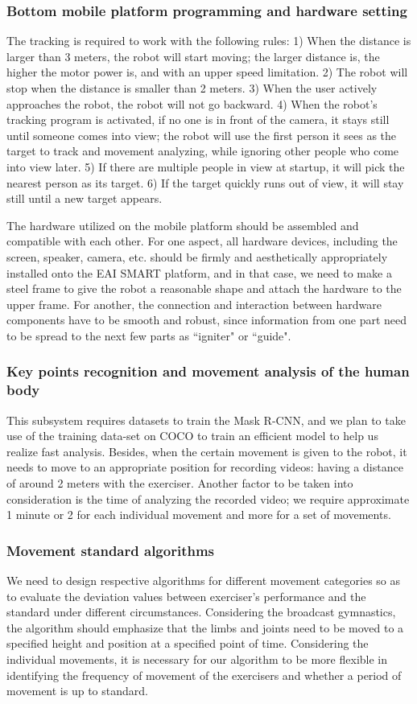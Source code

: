 \subsubsection{Bottom mobile platform programming and hardware setting}
The tracking is required to work with the following rules: 1) When the distance is larger than 3 meters, the robot will start moving; the larger distance is, the higher the motor power is, and with an upper speed limitation. 2) The robot will stop when the distance is smaller than 2 meters. 3) When the user actively approaches the robot, the robot will not go backward. 4) When the robot’s tracking program is activated, if no one is in front of the camera, it stays still until someone comes into view; the robot will use the first person it sees as the target to track and movement analyzing, while ignoring other people who come into view later. 5) If there are multiple people in view at startup, it will pick the nearest person as its target. 6) If the target quickly runs out of view, it will stay still until a new target appears.

The hardware utilized on the mobile platform should be assembled and compatible with each other. For one aspect, all hardware devices, including the screen, speaker, camera, etc. should be firmly and aesthetically appropriately installed onto the EAI SMART platform, and in that case, we need to make a steel frame to give the robot a reasonable shape and attach the hardware to the upper frame. For another, the connection and interaction between hardware components have to be smooth and robust, since information from one part need to be spread to the next few parts as ``igniter" or ``guide".
\subsubsection{Key points recognition and movement analysis of the human body}
This subsystem requires datasets to train the Mask R-CNN, and we plan to take use of the training data-set on COCO to train an efficient model to help us realize fast analysis. Besides, when the certain movement is given to the robot, it needs to move to an appropriate position for recording videos: having a distance of around 2 meters with the exerciser. Another factor to be taken into consideration is the time of analyzing the recorded video; we require approximate 1 minute or 2 for each individual movement and more for a set of movements.
\subsubsection{Movement standard algorithms}
We need to design respective algorithms for different movement categories so as to evaluate the deviation values between exerciser’s performance and the standard under different circumstances. Considering the broadcast gymnastics, the algorithm should emphasize that the limbs and joints need to be moved to a specified height and position at a specified point of time. Considering the individual movements, it is necessary for our algorithm to be more flexible in identifying the frequency of movement of the exercisers and whether a period of movement is up to standard.
